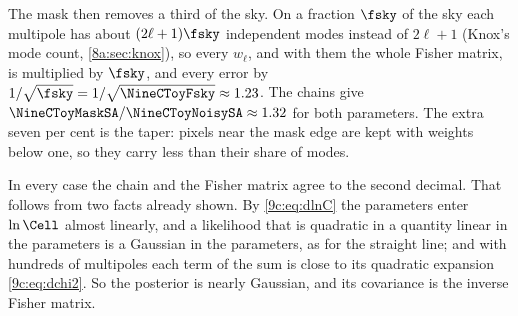The mask then removes a third of the sky. On a fraction $\fsky$ of the sky each multipole has about $(2\ell+1)\fsky$
independent modes instead of $2\ell+1$ (Knox's mode count, \cref{8a:sec:knox}), so every $w_\ell$, and with them the
whole Fisher matrix, is multiplied by $\fsky$, and every error by $1/\sqrt{\fsky}=1/\sqrt{\NineCToyFsky}\approx1.23$. The
chains give $\NineCToyMaskSA/\NineCToyNoisySA\approx1.32$ for both parameters. The extra seven per cent is the taper:
pixels near the mask edge are kept with weights below one, so they carry less than their share of modes.

In every case the chain and the Fisher matrix agree to the second decimal. That follows from two facts already
shown. By \eqref{9c:eq:dlnC} the parameters enter $\ln\Cell$ almost linearly, and a likelihood that is quadratic in a
quantity linear in the parameters is a Gaussian in the parameters, as for the straight line; and with hundreds of
multipoles each term of the sum is close to its quadratic expansion \eqref{9c:eq:dchi2}. So the posterior is nearly
Gaussian, and its covariance is the inverse Fisher matrix.


